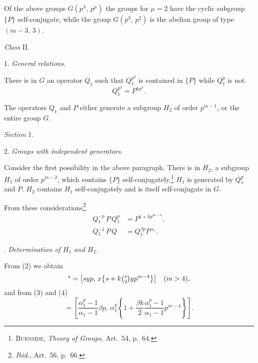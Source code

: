 \documentclass[oneside]{article}
\begin{document}
Of the above groups $G(p^\lambda,\, p^\mu)$ the groups for $\mu = 2$ have
the cyclic subgroup $\{P\}$ self-conjugate, while the group $G(p^3,\, p^2)$
is the abelian group of type $(\mbox{$m-3$},\, 3)$.

\bigskip \bigskip
\begin{center}
\Large\textit{Class} II. \normalsize
\end{center}
\setcounter{equation}{0}
1. \textit{General relations.}

There is in $G$ an operator $Q_1$ such that $Q{}_1^{p^2}$ is contained in
$\{P\}$ while $Q{}_1^p$ is not.
\begin{equation}
Q{}_1^{p^2} = P^{hp^2}. %
\end{equation}

The operators $Q_1$ and $P$ either generate a subgroup $H_2$ of order
$p^{m-1}$, or the entire group $G$.

\bigskip
\begin{center}
\large\textit{Section} 1. \normalsize
\end{center}

2. \textit{Groups with independent generators.}

Consider the first possibility in the above paragraph. There is in
$H_2$, a subgroup $H_1$ of order $p^{m-2}$, which contains $\{P\}$
self-conjugately.\footnote{\textsc{Burnside}, \textit{Theory of
Groups}, Art.\ 54, p.\ 64.} $H_1$ is generated by $Q{}_1^p$ and $P$.
$H_2$ contains $H_1$ self-conjugately and is itself self-conjugate
in $G$.

From these considerations\footnote{\textit{Ibid.}, Art.\ 56, p.\ 66.}
\begin{align}
Q{}_1^{-p}\, P\, Q{}_1^p &= P^{1 + kp^{m-4}}, \\ %
Q{}_1^{-1}\, P\, Q &= Q{}_1^{\beta p} P^{\alpha_1}. %
\end{align}

. \textit{Determination of $H_1$ and $H_2$.}

From (2) we obtain
\begin{equation}
[yp,\, x]^s = \bigl[syp,\, x\bigl\{s + k\tbinom{s}{2}yp^{m-4}\bigr\}\bigr] \quad (m > 4), %
\end{equation}
\noindent and from (3) and (4)
\begin{equation*}
[-p,\, 1,\, p] = \left[\frac{\alpha{}_1^p - 1}{\alpha_1 - 1}\beta p,\,
  \alpha{}_1^p\left\{1 + \frac{\beta k}{2}
  \frac{\alpha{}_1^p-1}{\alpha_1-1} p^{m-4} \right\} \right].
\end{equation*}
\end{document}
